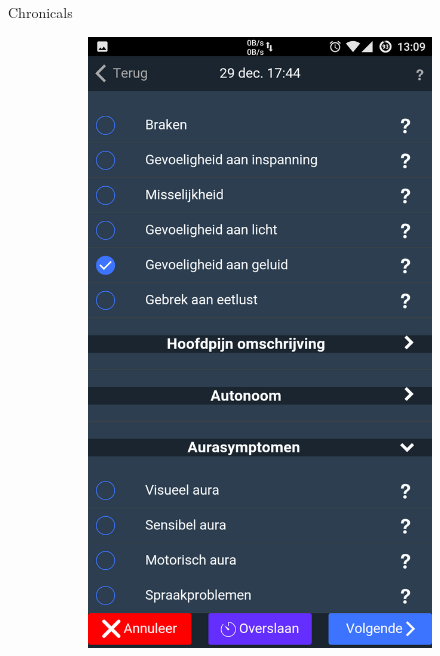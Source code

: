 \documentclass[english]{beamer}
\begin{document}
\begin{frame}{Chronicals}
\begin{figure}[!h]
\begin{subfigure}[b]{0.3\textwidth}
		\includegraphics[width=\textwidth]{figures/add_headache_6.png}
	\end{subfigure}
	\pause
	~ %
	\begin{subfigure}[b]{0.3\textwidth}

\end{subfigure}
\end{figure}
\end{frame}
\end{document}
